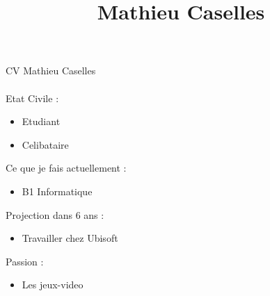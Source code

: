 \documentclass[12pt,oneside,a4paper]{article}
\begin{document}
\title{Mathieu Caselles}
CV Mathieu Caselles

\paragraph{}

Etat Civile :
\begin{itemize}
\item Etudiant
\item Celibataire
\end{itemize}

Ce que je fais actuellement :
\begin{itemize}
\item  B1 Informatique
\end{itemize}

Projection dans 6 ans  :
\begin{itemize}
\item Travailler chez Ubisoft
\end{itemize}

Passion :
\begin{itemize}
\item Les jeux-video
\end{itemize}
\end{document}
